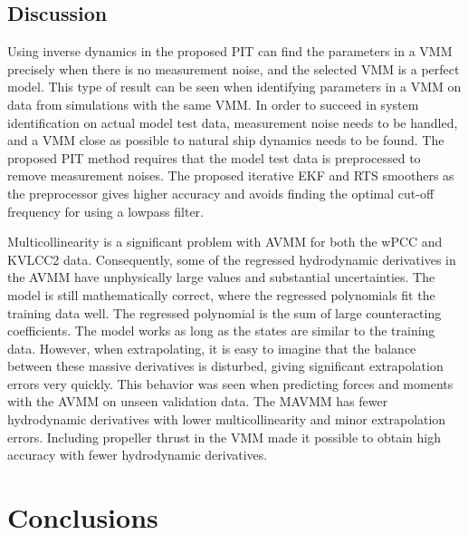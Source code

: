 \documentclass[review]{elsarticle}
\begin{document}
\subsection{Discussion}
\label{\detokenize{06.50_results_discussion:discussion}}\label{\detokenize{06.50_results_discussion::doc}}
  
Using inverse dynamics in the proposed PIT can find the parameters in a VMM precisely when there is no measurement noise, and the selected VMM is a perfect model. This type of result can be seen when identifying parameters in a VMM on data from simulations with the same VMM. In order to succeed in system identification on actual model test data, measurement noise needs to be handled, and a VMM close as possible to natural ship dynamics needs to be found. The proposed PIT method requires that the model test data is preprocessed to remove measurement noises. The proposed iterative EKF and RTS smoothers as the preprocessor gives higher accuracy and avoids finding the optimal cut-off frequency for using a low\sphinxhyphen{}pass filter.

  
Multicollinearity is a significant problem with AVMM for both the wPCC and KVLCC2 data. Consequently, some of the regressed hydrodynamic derivatives in the AVMM have unphysically large values and substantial uncertainties. The model is still mathematically correct, where the regressed polynomials fit the training data well.
The regressed polynomial is the sum of large counteracting coefficients. The model works as long as the states are similar to the training data. However, when extrapolating, it is easy to imagine that the balance between these massive derivatives is disturbed, giving significant extrapolation errors very quickly. This behavior was seen when predicting forces and moments with the AVMM on unseen validation data.
The MAVMM has fewer hydrodynamic derivatives with lower multicollinearity and minor extrapolation errors. Including propeller thrust in the VMM made it possible to obtain high accuracy with fewer hydrodynamic derivatives.


\section{Conclusions}
\label{\detokenize{10.01_conclusions:conclusions}}\label{\detokenize{10.01_conclusions:id1}}\label{\detokenize{10.01_conclusions::doc}}
  
\end{document}
